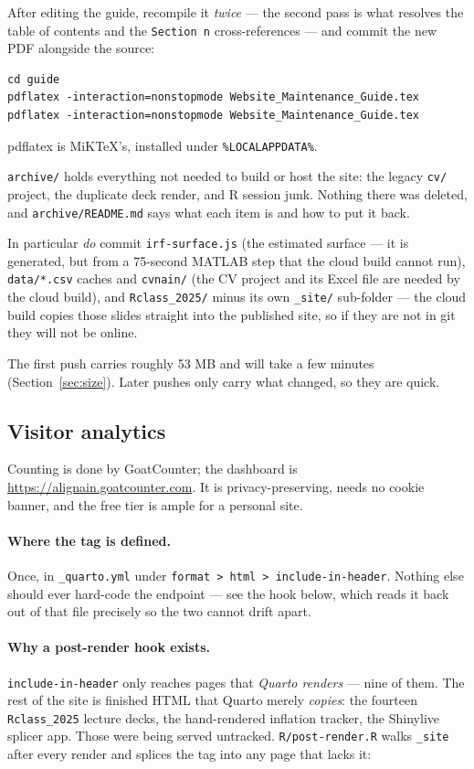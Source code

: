 \documentclass[11pt,a4paper]{article}
\newcommand{\file}[1]{\texttt{#1}}
\begin{document}
After editing the guide, recompile it \emph{twice} --- the second pass is
what resolves the table of contents and the \texttt{Section~n} cross-references --- and commit the new
PDF alongside the source:
\begin{lstlisting}
cd guide
pdflatex -interaction=nonstopmode Website_Maintenance_Guide.tex
pdflatex -interaction=nonstopmode Website_Maintenance_Guide.tex
\end{lstlisting}
pdflatex is MiKTeX's, installed under
\file{\%LOCALAPPDATA\%\string\Programs\string\MiKTeX}.

\file{archive/} holds everything not needed to build or host the site: the
legacy \file{cv/} project, the duplicate deck render, and R session junk.
Nothing there was deleted, and \file{archive/README.md} says what each item
is and how to put it back.

In particular \emph{do} commit \file{irf-surface.js} (the estimated surface
--- it is generated, but from a 75-second MATLAB step that the cloud build
cannot run), \file{data/*.csv} caches and
\file{cvnain/} (the CV project and its Excel file are needed by the cloud
build), and \file{Rclass\_2025/} minus its own \file{\_site/} sub-folder
--- the cloud build copies those slides straight into the published site,
so if they are not in git they will not be online.

The first push carries roughly 53 MB and will take a few minutes
(Section~\ref{sec:size}). Later pushes only carry what changed, so they are
quick.

\subsection{Visitor analytics}\label{sec:analytics}

Counting is done by GoatCounter; the dashboard is
\url{https://alignain.goatcounter.com}. It is privacy-preserving, needs no
cookie banner, and the free tier is ample for a personal site.

\paragraph{Where the tag is defined.} Once, in \file{\_quarto.yml} under
\texttt{format > html > include-in-header}. Nothing else should ever hard-code
the endpoint --- see the hook below, which reads it back out of that file
precisely so the two cannot drift apart.

\paragraph{Why a post-render hook exists.} \texttt{include-in-header} only
reaches pages that \emph{Quarto renders} --- nine of them. The rest of the
site is finished HTML that Quarto merely \emph{copies}: the fourteen
\file{Rclass\_2025} lecture decks, the hand-rendered inflation tracker, the
Shinylive splicer app. Those were being served untracked. \file{R/post-render.R}
walks \file{\_site} after every render and splices the tag into any page that
lacks it:
\end{document}
